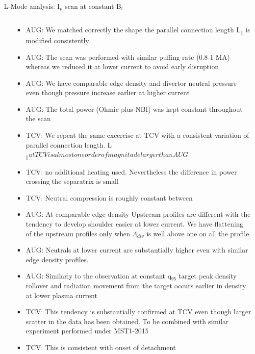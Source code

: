 \documentclass[10pt, compress]{beamer}
\begin{document}
\begin{frame}{L-Mode analysis: I$_p$ scan at constant B$_{t}$}
\begin{columns}
\begin{column}{0.65\textwidth}
  \end{column}
  \begin{column}{0.35\textwidth}
    \begin{itemize}
      \item<1|only@1> AUG: We matched correctly the shape the parallel
        connection length L$_{\parallel}$ is modified consistently
      \item<1|only@1> AUG: The scan was performed with similar puffing rate (0.8-1
        MA) whereas we reduced it at lower current to avoid early disruption
      \item<2|only@2> AUG: We have comparable edge density and divertor neutral
        pressure even though pressure increase earlier at higher current
      \item<2|only@2> AUG: The total power (Ohmic plus NBI) was kept
        constant throughout the scan
      \item<3|only@3> TCV: We repeat the same excercise at TCV with a
        consistent variation of parallel connection
        length. \alert{L$_{\parallel} at TCV is almost one order of
          magnitude larger than AUG$}
      \item<4|only@4> TCV: no additional heating
        used. Nevertheless the difference in power crossing the separatrix
        is small
      \item<4|only@4> TCV: Neutral compression is roughly constant between
      \item<5|only@5> AUG: At comparable edge density Upstream profiles are
        different with the tendency to develop shoulder easier at
        lower current. \alert{We have flattening of the upstream
          profiles only when $\Lambda_{div}$ is well above one on all
          the profile}
        \item<6|only@6> AUG: Neutrals at lower current are substantially
          higher even with similar edge density profiles.
        \item<7|only@7> AUG: Similarly to the observation at constant
          q$_{95}$ target peak density rollover and radiation movement
          from the target occurs earlier in density at lower plasma current
      \item<8|only@8> TCV: This tendency is substantially confirmed at
        TCV even though larger scatter in the data has been
        obtained. To be combined with similar experiment performed
        under MST1-2015  
      \item<9|only@9> TCV: This is consistent with onset of detachment

\end{itemize}
\end{column}
\end{columns}
\end{frame}
\end{document}
